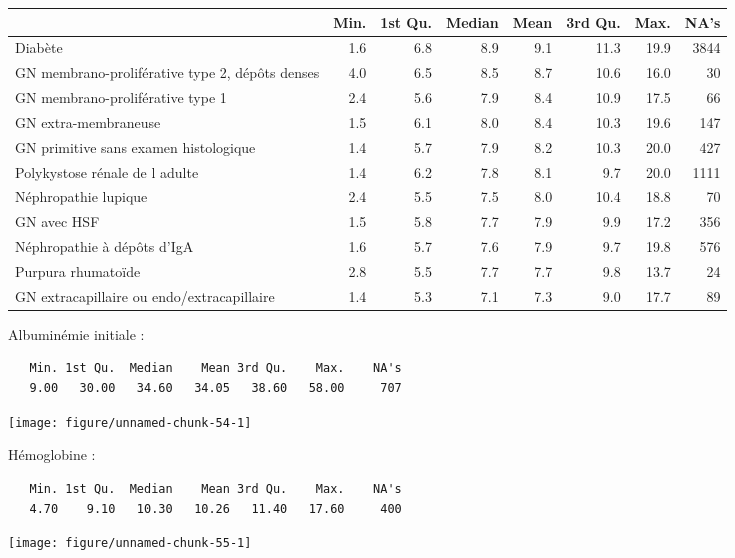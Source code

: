 \documentclass[11pt,a4paper]{article}\usepackage[]{graphicx}\usepackage[]{color}
\makeatletter
\def\maxwidth{ %
  \ifdim\Gin@nat@width>\linewidth
    \linewidth
  \else
    \Gin@nat@width
  \fi
}
\newenvironment{kframe}{%
 \def\at@end@of@kframe{}%
 \ifinner\ifhmode%
  \def\at@end@of@kframe{\end{minipage}}%
  \begin{minipage}{\columnwidth}%
 \fi\fi%
 \def\FrameCommand##1{\hskip\@totalleftmargin \hskip-\fboxsep
 \colorbox{shadecolor}{##1}\hskip-\fboxsep
     \hskip-\linewidth \hskip-\@totalleftmargin \hskip\columnwidth}%
 \MakeFramed {\advance\hsize-\width
   \@totalleftmargin\z@ \linewidth\hsize
   \@setminipage}}%
 {\par\unskip\endMakeFramed%
 \at@end@of@kframe}
\newenvironment{knitrout}{}{} %
\makeatother
\begin{document}
\begin{table}[H]
\centering
\begingroup\small
\begin{tabular}{lrrrrrrr}
  \hline
 & Min. & 1st Qu. & Median & Mean & 3rd Qu. & Max. & NA's \\ 
  \hline
Diabète & 1.6 & 6.8 & 8.9 & 9.1 & 11.3 & 19.9 & 3844 \\ 
  GN membrano-proliférative type 2, dépôts denses & 4.0 & 6.5 & 8.5 & 8.7 & 10.6 & 16.0 & 30 \\ 
  GN membrano-proliférative type 1 & 2.4 & 5.6 & 7.9 & 8.4 & 10.9 & 17.5 & 66 \\ 
  GN extra-membraneuse & 1.5 & 6.1 & 8.0 & 8.4 & 10.3 & 19.6 & 147 \\ 
  GN primitive sans examen histologique & 1.4 & 5.7 & 7.9 & 8.2 & 10.3 & 20.0 & 427 \\ 
  Polykystose rénale de l adulte & 1.4 & 6.2 & 7.8 & 8.1 & 9.7 & 20.0 & 1111 \\ 
  Néphropathie lupique & 2.4 & 5.5 & 7.5 & 8.0 & 10.4 & 18.8 & 70 \\ 
  GN avec HSF & 1.5 & 5.8 & 7.7 & 7.9 & 9.9 & 17.2 & 356 \\ 
  Néphropathie à dépôts d'IgA & 1.6 & 5.7 & 7.6 & 7.9 & 9.7 & 19.8 & 576 \\ 
  Purpura rhumatoïde & 2.8 & 5.5 & 7.7 & 7.7 & 9.8 & 13.7 & 24 \\ 
  GN extracapillaire ou endo/extracapillaire & 1.4 & 5.3 & 7.1 & 7.3 & 9.0 & 17.7 & 89 \\ 
   \hline
\end{tabular}
\endgroup
\end{table}


Albuminémie initiale :

\begin{knitrout}
\color{fgcolor}\begin{kframe}
\begin{verbatim}
   Min. 1st Qu.  Median    Mean 3rd Qu.    Max.    NA's 
   9.00   30.00   34.60   34.05   38.60   58.00     707 
\end{verbatim}
\end{kframe}
\texttt{[image: figure/unnamed-chunk-54-1]} 

\end{knitrout}

Hémoglobine :

\begin{knitrout}
\color{fgcolor}\begin{kframe}
\begin{verbatim}
   Min. 1st Qu.  Median    Mean 3rd Qu.    Max.    NA's 
   4.70    9.10   10.30   10.26   11.40   17.60     400 
\end{verbatim}
\end{kframe}
\texttt{[image: figure/unnamed-chunk-55-1]} 

\end{knitrout}
\end{document}
